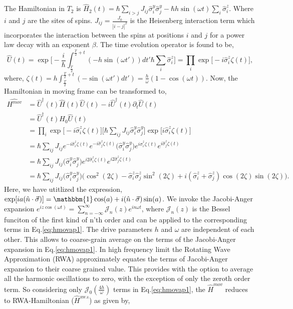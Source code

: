 \documentclass[%
nofootinbib,
reprint,
superscriptaddress,
amsmath,amssymb,showkeys,
aps,
prb,
]{revtex4-2}
\begin{document}
	The Hamiltonian in $T_2$ is $\displaystyle \hat{H}_2(t) = \hbar\sum_{i>j} J_{ij}\hat{\sigma}^y_i\hat{\sigma}^y_j - \hbar h \sin(\omega t) \sum_i \hat{\sigma}^z_i$.
	Where $i$ and $j$ are the sites of spins. $J_{ij} = \frac{J_0}{|i-j|^\beta}$ is the Heisenberg interaction term which incorporates the interaction between the spins at positions  $i$ and $j$ for a power law decay with an exponent $\beta$. 
	The time evolution operator is found to be,
	\begin{equation}
		\hat{U}(t) = \exp \bigg[-\frac{i}{\hbar}\int_{\frac{T}{2}}^{\frac{T}{2}+t} (-h \sin(\omega t'))dt' \hbar\sum_i\hat{\sigma}^z_i\bigg]
		=\prod_{i} \exp\big[-i \hat{\sigma}^z_i\zeta(t)\big],
	\end{equation}
	where, $\displaystyle \zeta (t) = h\int_{\frac{T}{2}}^{\frac{T}{2}+t}  (-\sin(\omega t')dt') =\frac{h}{\omega}(1-\cos(\omega t))$.
	Now, the Hamiltonian in moving frame can be transformed to\cite{haldar_statistical_2022},
	\begin{align}
		\hat{H^{mov}} &= \hat{U}^\dagger(t) \hat{H}(t) \hat{U}(t)- i \hat{U}^\dagger(t) \partial_t \hat{U}(t) \nonumber\\
		&= \hat{U}^\dagger(t) H_0 \hat{U}(t)\nonumber\\
		&= \prod_{i} \exp\big[-i\hat{\sigma}^z_i \zeta(t)\big] \big[\hbar\sum_{ij}J_{ij}\hat{\sigma}^y_i\hat{\sigma}^y_j\big] \exp\big[ i\hat{\sigma}^z_i \zeta(t)\big]\nonumber\\
		&= \hbar\sum_{ij} J_{ij} e^{-i\hat{\sigma}^z_i \zeta(t)} e^{-i\hat{\sigma}^z_j  \zeta(t)}\Big(\hat{\sigma}^y_i\hat{\sigma}^y_j\Big)e^{i\hat{\sigma}^z_i \zeta(t)} e^{i\hat{\sigma}^z_j \zeta(t)}\nonumber\\
		&= \hbar\sum_{ij} J_{ij} \Big(\hat{\sigma}^y_i\hat{\sigma}^y_j\Big)e^{i2\hat{\sigma}^z_i \zeta(t)} e^{i2\hat{\sigma}^z_j \zeta(t)}\nonumber\\
		&= \hbar\sum_{ij} J_{ij} \Big(\hat{\sigma}^y_i\hat{\sigma}^y_j\Big) \Big(\cos^2(2\zeta) -\hat{\sigma}^z_i\hat{\sigma}^z_j \sin^2(2\zeta) + i (\hat{\sigma}^z_i + \hat{\sigma}^z_j)\cos(2\zeta)\sin(2\zeta)\Big).
		\label{eq:hmovap1}
	\end{align}
	Here, we have utitlized the expression, $\displaystyle \exp[ia(\hat{n}\cdot\vec{\sigma})] = \mathbbm{1} \cos(a) + i (\hat{n}\cdot\vec{\sigma})\sin(a)$.	We invoke the Jacobi-Anger expansion $\displaystyle e^{iz\cos(\omega t)} = \sum_{n=-\infty}^{\infty}\mathcal{J}_n(z)e^{in\omega t}$\cite{arfkenmath}, where $\mathcal{J}_n(z)$ is the Bessel funciton of the first kind of n'th order and can be applied to the corresponding terms in Eq.\eqref{eq:hmovap1}. The drive parameters $h$ and $\omega$ are independent of each other. This allows to coarse-grain average on the terms of the Jacobi-Anger expansion in Eq.\eqref{eq:hmovap1}. In high frequency limit the Rotating Wave Approximation (RWA) approximately equates the terms of Jacobi-Anger expansion to their coarse grained value. This provides with the option to average all the harmonic oscillations to zero, with the exception of only the zeroth order term. So considering only $\mathcal{J}_0\left(\frac{4h}{\omega}\right)$ terms in Eq.\eqref{eq:hmovap1}, the $\hat{H}^{mov}$ reduces to RWA-Hamiltonian ($\hat{H}^{_{RWA}}$) as given by,
\end{document}
